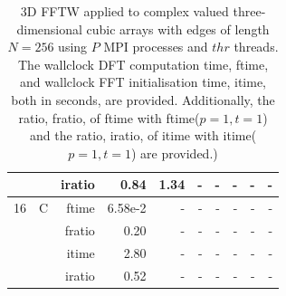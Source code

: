 \documentclass[a4paper]{article}
\begin{document}
\begin{table}[htbp]
\begin{center}
\begin{small}
\begin{tabular}{|r|r|r|r|r|r|r|r|r|r|}
             &             &  iratio &    0.84 &    1.34  &      - &      - &      - &      - &      - \\\hline
   16 &   C &  ftime &    6.58e-2 &      - &      - &      - &      - &      - &      - \\
             &             &  fratio &    0.20 &      - &      - &      - &      - &      - &      - \\
             &             &  itime &    2.80  &      - &      - &      - &      - &      - &      - \\
             &             &  iratio &    0.52 &      - &      - &      - &      - &      - &      - \\\hline
\end{tabular}
\caption{3D FFTW applied to complex valued three-dimensional cubic arrays with edges of length $N=256$ using $P$ MPI processes and $thr$ threads. The wallclock DFT computation time, ftime, and wallclock FFT initialisation time, itime, both in seconds, are provided. Additionally, the ratio, fratio, of ftime  with ftime($p=1,t=1$) and the ratio, iratio, of itime  with itime($p=1,t=1$) are provided.) }\label{Tbl:FFTW3d256c}
\end{small}
\end{center}
\end{table}
\end{document}
